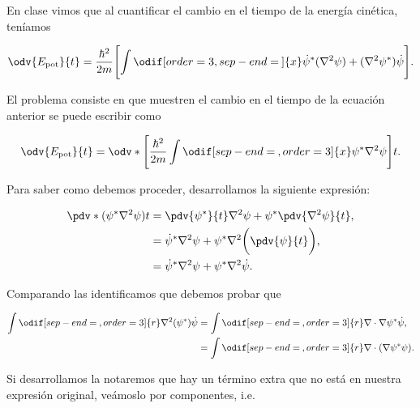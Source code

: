 \documentclass[../main.tex]{subfiles}
\begin{document}
\begin{problema}[10]
	En clase vimos que al cuantificar el cambio en el tiempo de la energía
	cinética, teníamos

	\begin{equation}
		\odv{E_{\text{pot}}}{t} = \dfrac{\hbar^{2}}{2m}\Biggl[\int \odif[order=3,sep-end=\medspace]{x} \dot{\psi}^{*}(\nabla^{2}{\psi}) + (\nabla^{2}{\psi^{*}})\dot{\psi}\Biggr].
		\label{eq:potential-energy}
	\end{equation}

	El problema consiste en que muestren el cambio en el tiempo de la
	ecuación anterior se puede escribir como

	\begin{equation*}
		\odv{E_{\text{pot}}}{t} = \odv*{\Biggl[\dfrac{\hbar^{2}}{2m}\int \odif[sep-end=\medspace, order=3]{x} \psi^{*}\nabla^{2}{\psi}\Biggr]}{t}.
	\end{equation*}
\end{problema}

\startsolution

Para saber como debemos proceder, desarrollamos la siguiente expresión:

\begin{align}
	\pdv*{( \psi^{*}\nabla^{2}{\psi} )}{t} & = \pdv{\psi^{*}}{t}\nabla^{2}{\psi} + \psi^{*}\pdv{\nabla^{2}{\psi}}{t},\nonumber            \\
	                                       & = \dot{\psi}^{*}\nabla^{2}{\psi} + \psi^{*}\nabla^{2}{\biggl(\pdv{\psi}{t}\biggr)},\nonumber \\
	                                       & = \dot{\psi}^{*}\nabla^{2}{\psi} + \psi^{*}\nabla^{2}{\dot{\psi}}.\label{eq:time-derivate}
\end{align}

Comparando las  identificamos que
debemos probar que

\begin{align}
	\int \odif[sep-end=\medspace, order = 3]{r} \nabla^{2}{(\psi^{*})}\dot{\psi} & = \int \odif[sep-end=\medspace, order = 3]{r} \nabla\cdot\nabla\psi^{*}\dot{\psi},\nonumber                         \\
	                                                                             & = \int \odif[sep-end=\medspace, order = 3]{r} \nabla \cdot{(\nabla{\psi^{*}}\psi)}.\label{eq:laplacian-probability}
\end{align}

\pagebreak
Si desarrollamos la  notaremos que hay un
término extra que no está en nuestra expresión original, veámoslo por componentes, i.e.
\end{document}
